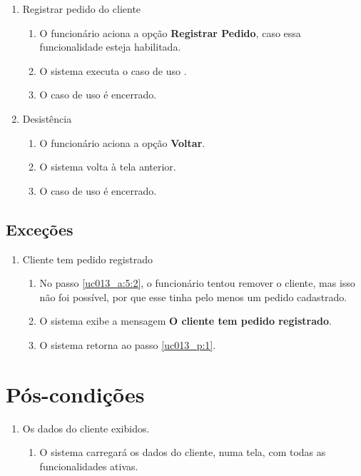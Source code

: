 \begin{enumerate}[label=A\arabic*]
	\item Registrar pedido do cliente
	\begin{enumerate}[label*=.\arabic*]
		\item O funcionário aciona a opção \textbf{Registrar Pedido}, caso essa funcionalidade esteja habilitada.
		\item O sistema executa o caso de uso .
		\item O caso de uso é encerrado.
	\end{enumerate}
		
	\item Desistência
	\begin{enumerate}[label*=.\arabic*]
		\item O funcionário aciona a opção \textbf{Voltar}.
		\item O sistema volta à tela anterior.
		\item O caso de uso é encerrado.		
	\end{enumerate}
\end{enumerate}

\subsection{Exceções}

\begin{enumerate}[label=E\arabic*]
	\item Cliente tem pedido registrado \label{uc013_e:1}
	\begin{enumerate}[label*=.\arabic*]
		\item[] No passo \ref{uc013_a:5:2}, o funcionário tentou remover o cliente, mas isso não foi possível, por que esse tinha pelo menos um pedido cadastrado.
		\item O sistema exibe a mensagem \textbf{O cliente tem pedido registrado}.
		\item O sistema retorna ao passo \ref{uc013_p:1}.
	\end{enumerate}
\end{enumerate}

\section{Pós-condições}

\begin{enumerate}
	\item Os dados do cliente exibidos.
	\begin{enumerate}
		\item O sistema carregará os dados do cliente, numa tela, com todas as funcionalidades ativas.
	\end{enumerate}
\end{enumerate}

